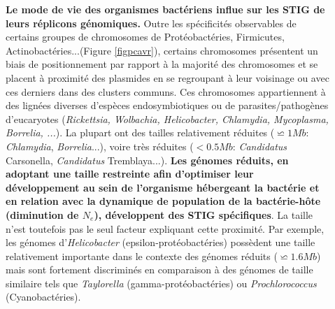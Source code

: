\begin{description}
\item[\textbullet] \textbf{Le mode de vie des organismes bactériens influe sur les STIG de leurs réplicons génomiques.} Outre les spécificités observables de certains groupes de chromosomes de Protéobactéries, Firmicutes, Actinobactéries...(Figure \ref{figpcavr}), certains chromosomes présentent un biais de positionnement par rapport à la majorité des chromosomes et se placent à proximité des plasmides en se regroupant à leur voisinage ou avec ces derniers dans des clusters communs. Ces chromosomes appartiennent à des lignées diverses d'espèces endosymbiotiques ou de parasites/pathogènes d'eucaryotes (\textit{Rickettsia, Wolbachia, Helicobacter, Chlamydia, Mycoplasma, Borrelia, ...}). La plupart ont des tailles relativement réduites ($ \backsimeq 1 Mb$: \textit{Chlamydia}, \textit{Borrelia}...), voire très réduites ($<0.5 Mb$: \textit{Candidatus} Carsonella, \textit{Candidatus} Tremblaya...). {\bfseries \color{orange}Les génomes réduits, en adoptant une taille restreinte afin d'optimiser leur développement au sein de l'organisme hébergeant la bactérie et en relation avec la dynamique de population de la bactérie-hôte (diminution de $N_e$), développent des STIG spécifiques}. La taille n'est toutefois pas le seul facteur expliquant cette proximité. Par exemple, les génomes d'\textit{Helicobacter} (epsilon-protéobactéries) possèdent une taille relativement importante dans le contexte des génomes réduits ($\backsimeq 1.6 Mb$) mais sont fortement discriminés en comparaison à des génomes de taille similaire tels que \textit{Taylorella} (gamma-protéobactéries) ou \textit{Prochlorococcus} (Cyanobactéries).
\end{description} 

